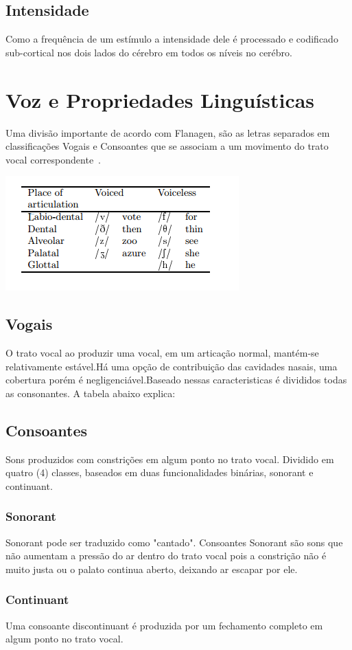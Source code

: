 	\subsection{Intensidade}
	Como a frequência de um estímulo a intensidade dele é processado e codificado sub-cortical nos dois lados do cérebro em todos os níveis no cerébro.\cite{Foundation1}
		


\section{Voz e Propriedades Linguísticas}
	Uma divisão importante de acordo com Flanagen, são as letras separados em classificações Vogais e Consoantes que se associam a um movimento do trato vocal correspondente~\cite{JFlanagan}.
	
	\includegraphics{tabelaConsoantes.png}
	
	\subsection{Vogais}
	
	O trato vocal ao produzir uma vocal, em um articação normal, mantém-se relativamente estável.Há uma opção de contribuição das cavidades nasais, uma cobertura porém é negligenciável.Baseado nessas caracteristicas é divididos todas as consonantes. A tabela abaixo explica:
	
	
	\subsection{Consoantes}
	Sons produzidos com constrições em algum ponto no trato vocal. Dividido em quatro (4) classes, baseados em duas funcionalidades binárias, sonorant e continuant.
	
	
		\subsubsection{Sonorant}	 
			Sonorant pode ser traduzido como "cantado". Consoantes Sonorant são sons que não aumentam a pressão do ar dentro do trato vocal pois a constrição não é muito justa ou o palato continua aberto, deixando ar escapar por ele.
			
		\subsubsection{Continuant}
			Uma consoante discontinuant é produzida por um fechamento completo em algum ponto no trato vocal.

